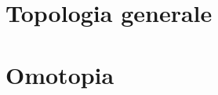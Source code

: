 \documentclass[a4paper, 11pt, twoside, openright, italian]{memoir}
\begin{document}
\frontmatter

%


\mainmatter

\part{Topologia generale}


\part{Omotopia}
%
%

%
%
%
%
%
%
%
%
%
%
%
%
%
%
%
%
%
%
%
\end{document}
